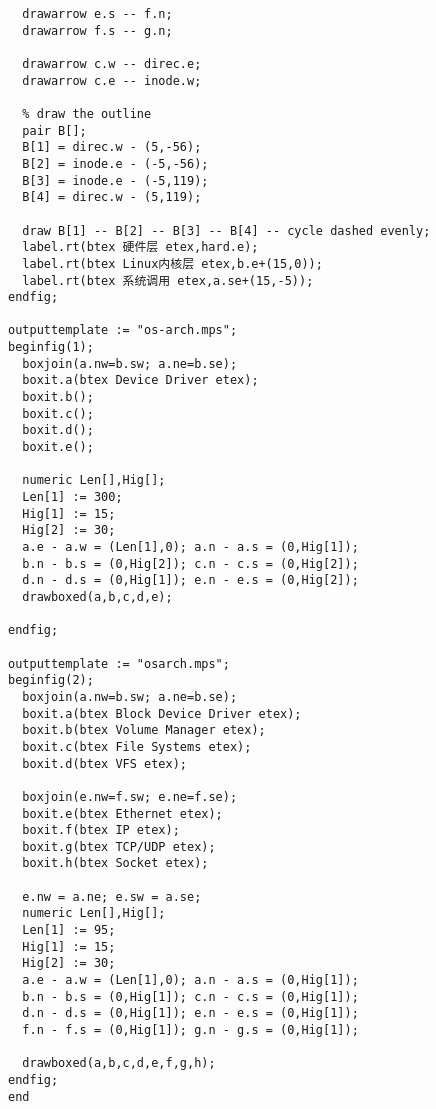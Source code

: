 \begin{verbatim}
  drawarrow e.s -- f.n;
  drawarrow f.s -- g.n;

  drawarrow c.w -- direc.e;
  drawarrow c.e -- inode.w;

  % draw the outline
  pair B[];
  B[1] = direc.w - (5,-56);
  B[2] = inode.e - (-5,-56);
  B[3] = inode.e - (-5,119);
  B[4] = direc.w - (5,119);

  draw B[1] -- B[2] -- B[3] -- B[4] -- cycle dashed evenly;
  label.rt(btex 硬件层 etex,hard.e);
  label.rt(btex Linux内核层 etex,b.e+(15,0));
  label.rt(btex 系统调用 etex,a.se+(15,-5));
endfig;

outputtemplate := "os-arch.mps";
beginfig(1);
  boxjoin(a.nw=b.sw; a.ne=b.se);
  boxit.a(btex Device Driver etex);
  boxit.b();
  boxit.c();
  boxit.d();
  boxit.e();

  numeric Len[],Hig[];
  Len[1] := 300;
  Hig[1] := 15;
  Hig[2] := 30;
  a.e - a.w = (Len[1],0); a.n - a.s = (0,Hig[1]);
  b.n - b.s = (0,Hig[2]); c.n - c.s = (0,Hig[2]);
  d.n - d.s = (0,Hig[1]); e.n - e.s = (0,Hig[2]);
  drawboxed(a,b,c,d,e);

endfig;

outputtemplate := "osarch.mps";
beginfig(2);
  boxjoin(a.nw=b.sw; a.ne=b.se);
  boxit.a(btex Block Device Driver etex);
  boxit.b(btex Volume Manager etex);
  boxit.c(btex File Systems etex);
  boxit.d(btex VFS etex);

  boxjoin(e.nw=f.sw; e.ne=f.se);
  boxit.e(btex Ethernet etex);
  boxit.f(btex IP etex);
  boxit.g(btex TCP/UDP etex);
  boxit.h(btex Socket etex);

  e.nw = a.ne; e.sw = a.se;  
  numeric Len[],Hig[];
  Len[1] := 95;
  Hig[1] := 15;
  Hig[2] := 30;
  a.e - a.w = (Len[1],0); a.n - a.s = (0,Hig[1]);
  b.n - b.s = (0,Hig[1]); c.n - c.s = (0,Hig[1]);
  d.n - d.s = (0,Hig[1]); e.n - e.s = (0,Hig[1]);
  f.n - f.s = (0,Hig[1]); g.n - g.s = (0,Hig[1]);

  drawboxed(a,b,c,d,e,f,g,h);
endfig;
end
\end{verbatim}